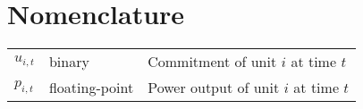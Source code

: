 \chapter*{Nomenclature}

\begin{tabular}{lll}
  $u_{i, t}$ & binary & Commitment of unit $i$ at time $t$\\
  $p_{i, t}$ & floating-point & Power output of unit $i$ at time $t$
\end{tabular}